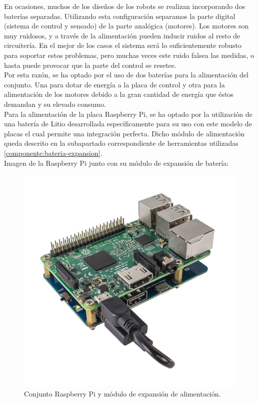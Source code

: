 En ocasiones, muchos de los diseños de los robots se realizan incorporando dos baterías separadas. Utilizando esta configuración separamos la
parte digital (sistema de control y sensado) de la parte analógica (motores). Los motores son muy ruidosos, y a través de la alimentación pueden inducir ruidos
al resto de circuitería. En el mejor de los casos el sistema será lo suficientemente robusto para soportar estos problemas, pero muchas
veces este ruido falsea las medidas, o hasta puede provocar que la parte del control se resetee.\\

Por esta razón, se ha optado por el uso de dos baterías para la alimentación del conjunto. Una para dotar de energía a la placa de control y otra para la alimentación de los 
motores debido a la gran cantidad de energía que éstos demandan y su elevado consumo.\\

Para la alimentación de la placa Raspberry Pi, se ha optado por la utilización de una batería de Litio desarrollada específicamente para su uso con este modelo de placas el cual permite una integración
perfecta. Dicho módulo de alimentación queda descrito en la subapartado correspondiente de herramientas utilizadas \ref{componente:bateria-expansion}.\\

Imagen de la Raspberry Pi junto con su módulo de expansión de batería:

\begin{figure}[H]
  \begin{center}
    \includegraphics[scale=0.15]{imagenes/modulo-expansion-rpi.jpg}
  \end{center}
  \caption{Conjunto Raspberry Pi y módulo de expansión de alimentación.}
  \label{figura:rpi-modulo-bateria}
\end{figure}

